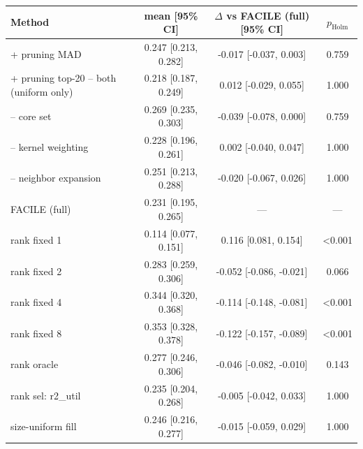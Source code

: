 \begin{tabular}{lccc}
\toprule
Method & mean [95\% CI] & $\Delta$ vs FACILE (full) [95\% CI] & $p_{\mathrm{Holm}}$ \\
\midrule
+ pruning MAD & 0.247 [0.213, 0.282] & -0.017 [-0.037, 0.003] & 0.759 \\
+ pruning top-20%
-- both (uniform only) & 0.218 [0.187, 0.249] & 0.012 [-0.029, 0.055] & 1.000 \\
-- core set & 0.269 [0.235, 0.303] & -0.039 [-0.078, 0.000] & 0.759 \\
-- kernel weighting & 0.228 [0.196, 0.261] & 0.002 [-0.040, 0.047] & 1.000 \\
-- neighbor expansion & 0.251 [0.213, 0.288] & -0.020 [-0.067, 0.026] & 1.000 \\
FACILE (full) & 0.231 [0.195, 0.265] & --- & --- \\
rank fixed 1 & 0.114 [0.077, 0.151] & 0.116 [0.081, 0.154] & <0.001 \\
rank fixed 2 & 0.283 [0.259, 0.306] & -0.052 [-0.086, -0.021] & 0.066 \\
rank fixed 4 & 0.344 [0.320, 0.368] & -0.114 [-0.148, -0.081] & <0.001 \\
rank fixed 8 & 0.353 [0.328, 0.378] & -0.122 [-0.157, -0.089] & <0.001 \\
rank oracle & 0.277 [0.246, 0.306] & -0.046 [-0.082, -0.010] & 0.143 \\
rank sel: r2_util & 0.235 [0.204, 0.268] & -0.005 [-0.042, 0.033] & 1.000 \\
size-uniform fill & 0.246 [0.216, 0.277] & -0.015 [-0.059, 0.029] & 1.000 \\
\bottomrule
\end{tabular}


